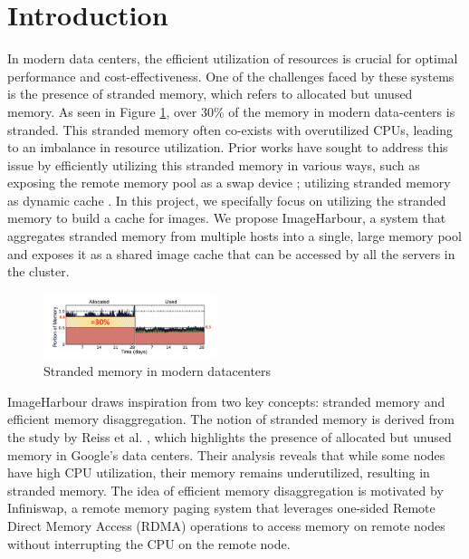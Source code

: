 \section{Introduction}
\label{sec:introduction}

In modern data centers, the efficient utilization of resources is crucial for optimal performance and cost-effectiveness. One of the challenges faced by these systems is the presence of stranded memory, which refers to allocated but unused memory. As seen in Figure \ref{fig:Stranded_memory}, over 30\% of the memory in modern data-centers is stranded. This stranded memory often co-exists with overutilized CPUs, leading to an imbalance in resource utilization. Prior works \cite{Infiniswap, Fastswap, Hermit, AdvancesAndChallenges, Redy} have sought to address this issue by efficiently utilizing this stranded memory in various ways, such as exposing the remote memory pool as a swap device \cite{Infiniswap, Fastswap, Hermit}; utilizing stranded memory as dynamic cache \cite{Redy}. In this project, we specifally focus on utilizing the stranded memory to build a cache for images. We propose ImageHarbour, a system that aggregates stranded memory from multiple hosts into a single, large memory pool and exposes it as a shared image cache that can be accessed by all the servers in the cluster.

\begin{figure}[h]
    \centering
    \includegraphics[width=0.45\textwidth]{Stranded_memory.png}
    \caption{Stranded memory in modern datacenters \cite{reiss2012heterogeneity}}
    \label{fig:Stranded_memory}
\end{figure}

ImageHarbour draws inspiration from two key concepts: stranded memory and efficient memory disaggregation. The notion of stranded memory is derived from the study by Reiss et al. \cite{reiss2012heterogeneity}, which highlights the presence of allocated but unused memory in Google's data centers. Their analysis reveals that while some nodes have high CPU utilization, their memory remains underutilized, resulting in stranded memory. The idea of efficient memory disaggregation is motivated by Infiniswap\cite{Infiniswap}, a remote memory paging system that leverages one-sided Remote Direct Memory Access (RDMA) operations to access memory on remote nodes without interrupting the CPU on the remote node.

